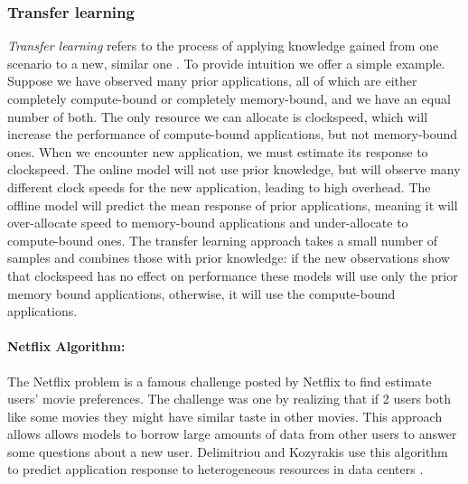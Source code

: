 \subsubsection{Transfer learning}
\textit{Transfer learning} refers to the process of applying knowledge
gained from one scenario to a new, similar one \cite{pan2010survey}.
To provide intuition we offer a simple example.  Suppose we have
observed many prior applications, all of which are either completely
compute-bound or completely memory-bound, and we have an equal number
of both.  The only resource we can allocate is clockspeed, which will
increase the performance of compute-bound applications, but not
memory-bound ones.  When we encounter new application, we must
estimate its response to clockspeed.  The online model will not use
prior knowledge, but will observe many different clock speeds for the
new application, leading to high overhead.  The offline model will
predict the mean response of prior applications, meaning it will
over-allocate speed to memory-bound applications and under-allocate to
compute-bound ones.  The transfer learning approach takes a small
number of samples and combines those with prior knowledge: if the new
observations show that clockspeed has no effect on performance these
models will use only the prior memory bound applications, otherwise,
it will use the compute-bound applications.

\paragraph{Netflix Algorithm:}
The Netflix problem is a famous challenge posted by Netflix to find
estimate users' movie preferences. The challenge was one by realizing
that if 2 users both like some movies they might have similar taste in
other movies. This approach allows allows models to borrow large
amounts of data from other users to answer some questions about a new
user.
Delimitriou and Kozyrakis use this algorithm to predict application
response to heterogeneous resources in data centers
\cite{Paragon,quasar}.


